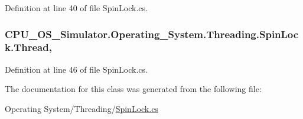 Definition at line 40 of file Spin\+Lock.\+cs.

\hypertarget{class_c_p_u___o_s___simulator_1_1_operating___system_1_1_threading_1_1_spin_lock_a1e950dc0372acfa9f7c9cd625a0f1417}{}
\subsubsection[{Thread}]{ C\+P\+U\+\_\+\+O\+S\+\_\+\+Simulator.\+Operating\+\_\+\+System.\+Threading.\+Spin\+Lock.\+Thread\hspace{0.3cm}{\ttfamily [get]}, {\ttfamily [set]}}\label{class_c_p_u___o_s___simulator_1_1_operating___system_1_1_threading_1_1_spin_lock_a1e950dc0372acfa9f7c9cd625a0f1417}


Definition at line 46 of file Spin\+Lock.\+cs.



The documentation for this class was generated from the following file\+:\begin{DoxyCompactItemize}
\item 
Operating System/\+Threading/\hyperlink{_spin_lock_8cs}{Spin\+Lock.\+cs}\end{DoxyCompactItemize}
